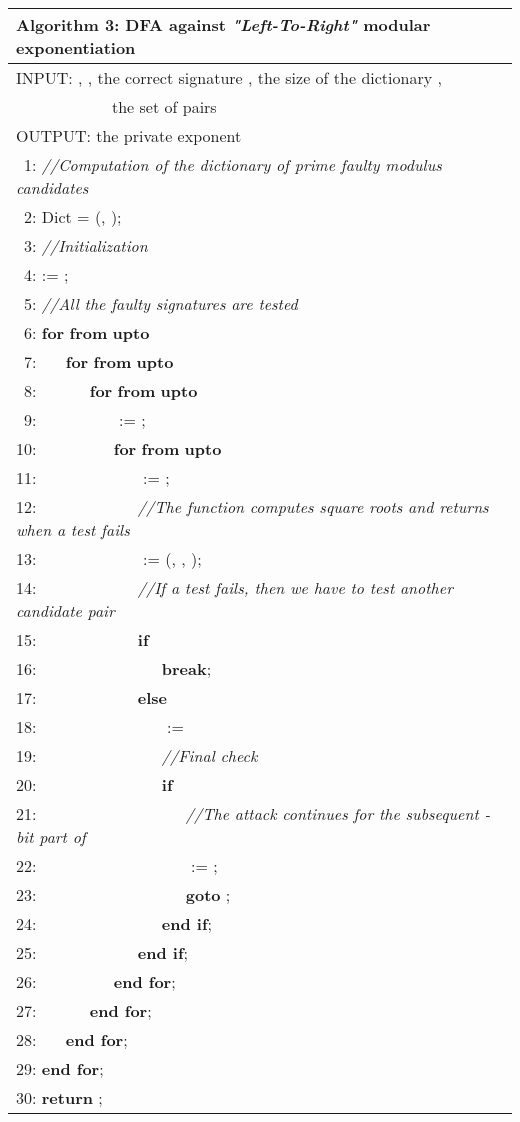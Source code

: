 \documentclass{article}
\begin{document}
\begin{table}[htbp]
\begin{center}
\begin{tabular}{l}
\hline
\hline
\textbf{Algorithm 3:} DFA against \textit{"Left-To-Right"} modular exponentiation\\
\hline
INPUT: , , the correct signature , the size of the dictionary ,\\
~~~~~~~~~~~~the set of pairs \\
OUTPUT: the private exponent \\
\hline
~1: \textit{//Computation of the dictionary of prime faulty modulus candidates}\\
~2: Dict = (, );\\
~3: \textit{//Initialization}\\
~4:  := ;\\
~5: \textit{//All the faulty signatures are tested}\\
~6: \textbf{for}  \textbf{from}  \textbf{upto} \\
~7: ~~~\textbf{for}  \textbf{from}  \textbf{upto} \\
~8: ~~~~~~\textbf{for}  \textbf{from}  \textbf{upto} \\
~9: ~~~~~~~~~ := ;\\
10: ~~~~~~~~~\textbf{for}  \textbf{from}  \textbf{upto} \\
11: ~~~~~~~~~~~~ := ;\\
12: ~~~~~~~~~~~~\textit{//The function computes  square roots and returns  when a test fails}\\
13: ~~~~~~~~~~~~ := (, , );\\
14: ~~~~~~~~~~~~\textit{//If a test fails, then we have to test another candidate pair}\\
15: ~~~~~~~~~~~~\textbf{if} \\
16: ~~~~~~~~~~~~~~~\textbf{break};\\
17: ~~~~~~~~~~~~\textbf{else}\\
18: ~~~~~~~~~~~~~~~ := \\
19: ~~~~~~~~~~~~~~~\textit{//Final check}\\
20: ~~~~~~~~~~~~~~~\textbf{if} \\
21: ~~~~~~~~~~~~~~~~~~\textit{//The attack continues for the subsequent -bit part of }\\
22: ~~~~~~~~~~~~~~~~~~ := ;\\
23: ~~~~~~~~~~~~~~~~~~\textbf{goto} ;\\
24: ~~~~~~~~~~~~~~~\textbf{end if};\\
25: ~~~~~~~~~~~~\textbf{end if};\\
26: ~~~~~~~~~\textbf{end for};\\
27: ~~~~~~\textbf{end for};\\
28: ~~~\textbf{end for};\\
29: \textbf{end for};\\
30: \textbf{return} ;\\
\hline
\end{tabular}
\end{center}
\end{table}
\end{document}
